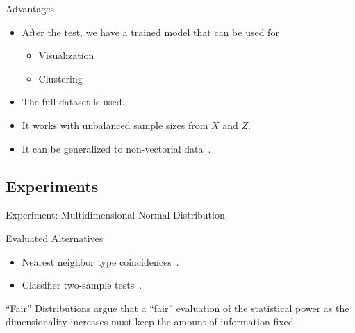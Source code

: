 \documentclass[10pt,notes]{beamer}
\begin{document}
\begin{frame}{Advantages}
    \begin{itemize}
        \item After the test, we have a trained model that can be used for
            
            \begin{itemize}
                \item Visualization
                \item Clustering~\cite{ultsch2005esom}
            \end{itemize}

        \item The full dataset is used.
        \item It works with unbalanced sample sizes from $X$ and $Z$.
        \item It can be generalized to non-vectorial data~\cite{kohonen1982self}.
    \end{itemize}

\end{frame}

\subsection{Experiments}

\begin{frame}{Experiment: Multidimensional Normal Distribution}
    \begin{block}{Evaluated Alternatives}
        \smallskip
        \begin{itemize}
            \item Nearest neighbor type coincidences~\cite{Henze1988, Schilling1986b}.
            \item Classifier two-sample tests~\cite{lopez2016revisiting}.
        \end{itemize}
    \end{block}
    \begin{block}{``Fair'' Distributions}
        \smallskip
        \cite{ramdas2015decreasing} argue that a ``fair'' evaluation of the
        statistical power as the dimensionality increases must keep the
        amount of information fixed.
    \end{block}

\end{frame}
\end{document}
